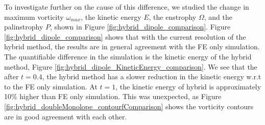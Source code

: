 To investigate further on the cause of this difference, we studied the change in maximum vorticity $\omega_{max}$, the kinetic energy $E$, the enstrophy $\Omega$, and the palinstrophy $P$, shown in Figure \ref{fig:hybrid_dipole_comparison}. Figure \ref{fig:hybrid_dipole_comparison} shows that with the current resolution of the hybrid method, the results are in general agreement with the FE only simulation. The quantifiable difference in the simulation is the kinetic energy of the hybrid method, Figure \ref{fig:hybrid_dipole_KineticEnergy_comparison}. We see that the after $t=0.4$, the hybrid method has a slower reduction in the kinetic energy w.r.t to the FE only simulation.
At $t=1$, the kinetic energy of hybrid is approximately 10\% higher than FE only simulation. This was unexpected, as Figure \ref{fig:hybrid_doubleMonolope_contourfComparison} shows the vorticity contours are in good agreement with each other.






